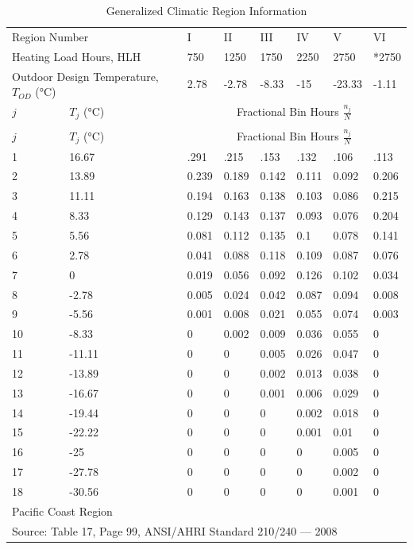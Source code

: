{\scriptsize
\begin{longtable}[c]{p{0.75in}p{0.75in}p{0.75in}p{0.75in}p{0.75in}p{0.75in}p{0.75in}p{0.75in}}
\caption{Generalized Climatic Region Information \label{table:generalized-climatic-region-information}} \tabularnewline
\toprule 
\multicolumn{2}{p{1.5in}}{\scriptsize \raggedright Region Number} & I & II & III & IV & V & VI \tabularnewline
\multicolumn{2}{p{1.5in}}{\scriptsize \raggedright Heating Load Hours, HLH} & 750 & 1250 & 1750 & 2250 & 2750 & *2750 \tabularnewline
\multicolumn{2}{p{1.5in}}{\scriptsize \raggedright Outdoor Design Temperature, \(T_{OD}\) (°C)} & 2.78 & -2.78 & -8.33 & -15 & -23.33 & -1.11 \tabularnewline
\midrule
\(j\) & \(T_j\) (°C) & \multicolumn{6}{c}{Fractional Bin Hours \(\frac{n_j}{N}\)} \tabularnewline
\midrule
\endfirsthead

\caption[]{Generalized Climatic Region Information} \tabularnewline
\toprule 
\(j\) & \(T_j\) (°C) & \multicolumn{6}{c}{Fractional Bin Hours \(\frac{n_j}{N}\)} \tabularnewline
\midrule
\endhead

1 & 16.67 & .291 & .215 & .153 & .132 & .106 & .113 \tabularnewline
2 & 13.89 & 0.239 & 0.189 & 0.142 & 0.111 & 0.092 & 0.206 \tabularnewline
3 & 11.11 & 0.194 & 0.163 & 0.138 & 0.103 & 0.086 & 0.215 \tabularnewline
4 & 8.33 & 0.129 & 0.143 & 0.137 & 0.093 & 0.076 & 0.204 \tabularnewline
5 & 5.56 & 0.081 & 0.112 & 0.135 & 0.1 & 0.078 & 0.141 \tabularnewline
6 & 2.78 & 0.041 & 0.088 & 0.118 & 0.109 & 0.087 & 0.076 \tabularnewline
7 & 0 & 0.019 & 0.056 & 0.092 & 0.126 & 0.102 & 0.034 \tabularnewline
8 & -2.78 & 0.005 & 0.024 & 0.042 & 0.087 & 0.094 & 0.008 \tabularnewline
9 & -5.56 & 0.001 & 0.008 & 0.021 & 0.055 & 0.074 & 0.003 \tabularnewline
10 & -8.33 & 0 & 0.002 & 0.009 & 0.036 & 0.055 & 0 \tabularnewline
11 & -11.11 & 0 & 0 & 0.005 & 0.026 & 0.047 & 0 \tabularnewline
12 & -13.89 & 0 & 0 & 0.002 & 0.013 & 0.038 & 0 \tabularnewline
13 & -16.67 & 0 & 0 & 0.001 & 0.006 & 0.029 & 0 \tabularnewline
14 & -19.44 & 0 & 0 & 0 & 0.002 & 0.018 & 0 \tabularnewline
15 & -22.22 & 0 & 0 & 0 & 0.001 & 0.01 & 0 \tabularnewline
16 & -25 & 0 & 0 & 0 & 0 & 0.005 & 0 \tabularnewline
17 & -27.78 & 0 & 0 & 0 & 0 & 0.002 & 0 \tabularnewline
18 & -30.56 & 0 & 0 & 0 & 0 & 0.001 & 0 \tabularnewline
\bottomrule
\multicolumn{8}{l}{\scriptsize * Pacific Coast Region} \tabularnewline
\multicolumn{8}{l}{\scriptsize Source: Table 17, Page 99, ANSI/AHRI Standard 210/240 --- 2008}
\end{longtable}}

